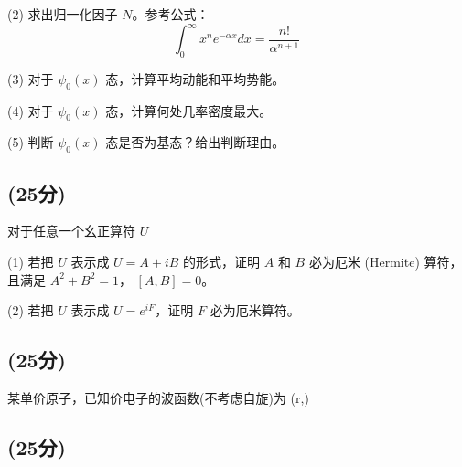 (2) 求出归一化因子 $N$。参考公式：
\[\int_0^\infty x^n e^{- \alpha x} dx = \frac{n!}{\alpha^{n+1}}~\]

(3) 对于 $\psi_0(x)$ 态，计算平均动能和平均势能。

(4) 对于 $\psi_0(x)$ 态，计算何处几率密度最大。

(5) 判断 $\psi_0(x)$ 态是否为基态？给出判断理由。
\subsection{(25分)}
对于任意一个幺正算符 \( U \)

(1) 若把 \( U \) 表示成 \( U = A + iB \) 的形式，证明 \( A \) 和 \( B \) 必为厄米 (Hermite) 算符，且满足 \( A^2 + B^2 = 1 \)， \([A, B] = 0 \)。

(2) 若把 \( U \) 表示成 \( U = e^{iF} \)，证明 \( F \) 必为厄米算符。
\subsection{(25分)}
某单价原子，已知价电子的波函数(不考虑自旋)为
$$\psi(r,)
\subsection{(25分)}